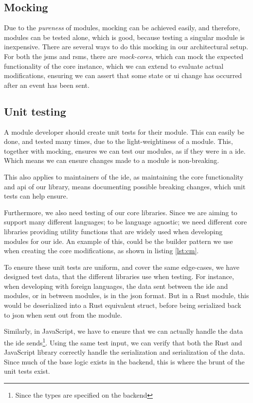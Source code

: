 \subsection{Mocking}

Due to the \textit{pureness} of modules, mocking can be achieved easily, and
therefore, modules can be tested alone, which is good, because testing a
singular module is inexpensive. There are several ways to do this mocking in our
architectural setup. For both the \gls*{jsms} and \gls*{rsms}, there are
\textit{mock-cores}, which can mock the expected functionality of the core
instance, which we can extend to evaluate actual modifications, ensuring we can
assert that some state or \gls*{ui} change has occurred after an event has been
sent.


\subsection{Unit testing}

A module developer should create unit tests for their module. This can easily be
done, and tested many times, due to the light-weightiness of a module. This,
together with mocking, ensures we can test our modules, as if they were in a
\gls*{ide}. Which means we can ensure changes made to a module is non-breaking.

This also applies to maintainers of the \gls*{ide}, as maintaining the core
functionality and \gls*{api} of our library, means documenting possible breaking
changes, which unit tests can help ensure.

Furthermore, we also need testing of our core libraries. Since we are aiming to
support many different languages; to be language agnostic; we need different core
libraries providing utility functions that are widely used when developing
modules for our \gls{ide}. An example of this, could be the builder pattern we
use when creating the core modifications, as shown in listing \ref{lst:cm}.

To ensure these unit tests are uniform, and cover the same edge-cases, we have
designed test data, that the different libraries use when testing. For instance,
when developing with foreign languages, the data sent between the \gls{ide} and
modules, or in between modules, is in the \gls{json} format. But in a Rust
module, this would be deserialized into a Rust equivalent struct, before being
serialized back to \gls{json} when sent out from the module.

Similarly, in JavaScript, we have to ensure that we can actually handle the data
the \gls{ide} sends\footnote{Since the types are specified on the backend}.
Using the same test input, we can verify that both the Rust and JavaScript
library correctly handle the serialization and serialization of the data. Since
much of the base logic exists in the backend, this is where the brunt of the unit
tests exist.


